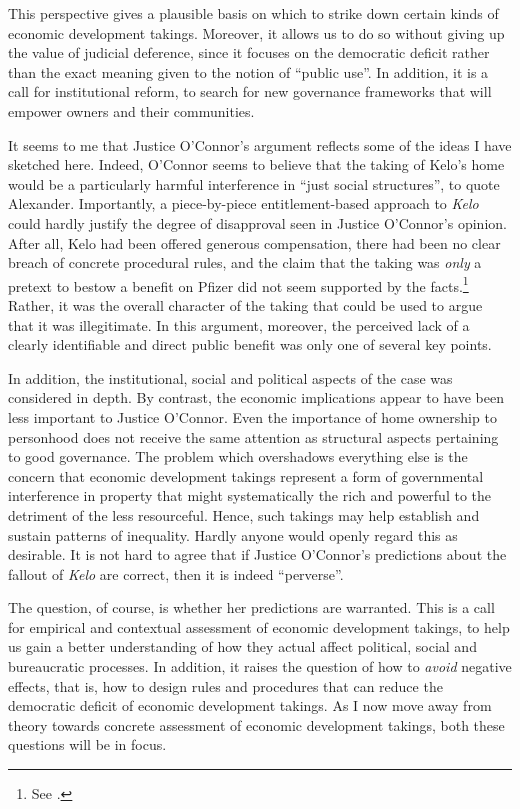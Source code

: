 This perspective gives a plausible basis on which to strike down certain kinds of economic development takings. Moreover, it allows us to do so without giving up the value of judicial deference, since it focuses on the democratic deficit rather than the exact meaning given to the notion of ``public use''. In addition, it is a call for institutional reform, to search for new governance frameworks that will empower owners and their communities.

It seems to me that Justice O'Connor's argument reflects some of the ideas I have sketched here. Indeed, O'Connor seems to believe that the taking of Kelo's home would be a particularly harmful interference in ``just social structures'', to quote Alexander. Importantly, a piece-by-piece entitlement-based approach to {\it Kelo} could hardly justify the degree of disapproval seen in Justice O'Connor's opinion. After all, Kelo had been offered generous compensation, there had been no clear breach of concrete procedural rules, and the claim that the taking was {\it only} a pretext to bestow a benefit on Pfizer did not seem supported by the facts.\footnote{See \cite{bell06}.} Rather, it was the overall character of the taking that could be used to argue that it was illegitimate. In this argument, moreover, the perceived lack of a clearly identifiable and direct public benefit was only one of several key points.

In addition, the institutional, social and political aspects of the case was considered in depth. By contrast, the economic implications appear to have been less important to Justice O'Connor. Even the importance of home ownership to personhood does not receive the same attention as structural aspects pertaining to good governance. The problem which overshadows everything else is the concern that economic development takings represent a form of governmental interference in property that might systematically  the rich and powerful to the detriment of the less resourceful. Hence, such takings may help establish and sustain patterns of inequality. Hardly anyone would openly regard this as desirable. It is not hard to agree that if Justice O'Connor's predictions about the fallout of {\it Kelo} are correct, then it is indeed ``perverse''. 

The question, of course, is whether her predictions are warranted. This is a call for empirical and contextual assessment of economic development takings, to help us gain a better understanding of how they actual affect political, social and bureaucratic processes. In addition, it raises the question of how to {\it avoid} negative effects, that is, how to design rules and procedures that can reduce the democratic deficit of economic development takings. As I now move away from theory towards concrete assessment of economic development takings, both these questions will be in focus.

